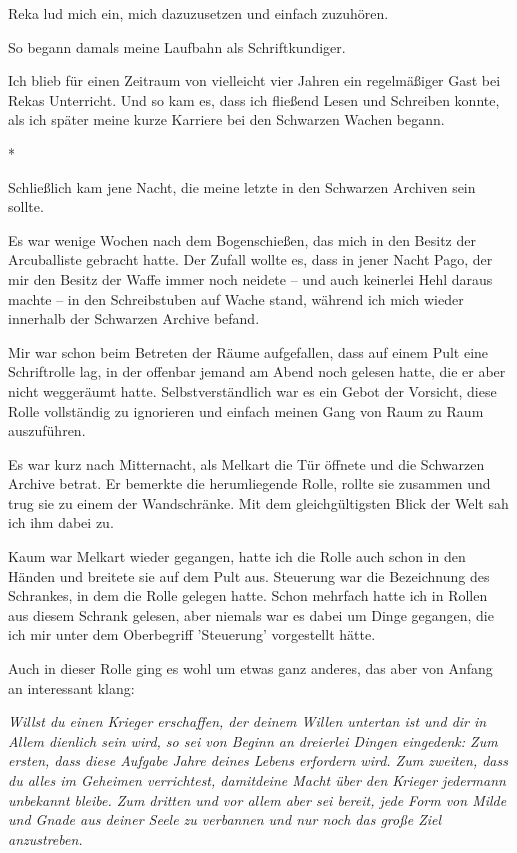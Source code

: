 \documentclass[10pt, a4paper, oneside]{book}
\begin{document}
\begin{multicols}{2}
Reka lud mich ein, mich dazuzusetzen und einfach zuzuhören.

So begann damals meine Laufbahn als Schriftkundiger.

Ich blieb für einen Zeitraum von vielleicht vier Jahren ein regelmäßiger Gast bei Rekas Unterricht. Und so kam es, dass ich fließend Lesen und Schreiben konnte, als ich später meine kurze Karriere bei den Schwarzen Wachen begann.

\begin{center}
    *
\end{center}

Schließlich kam jene Nacht, die meine letzte in den Schwarzen Archiven sein
sollte.

Es war wenige Wochen nach dem Bogenschießen, das mich in den Besitz der Arcuballiste gebracht hatte. Der Zufall wollte es, dass in jener Nacht Pago, der mir den Besitz der Waffe immer noch neidete – und auch keinerlei Hehl daraus machte – in den Schreibstuben auf Wache stand, während ich mich wieder innerhalb der Schwarzen Archive befand.

Mir war schon beim Betreten der Räume aufgefallen, dass auf einem Pult eine Schriftrolle lag, in der offenbar jemand am Abend noch gelesen hatte, die er aber nicht weggeräumt hatte. Selbstverständlich war es ein Gebot der Vorsicht, diese Rolle vollständig zu ignorieren und einfach meinen Gang von Raum zu Raum auszuführen.

Es war kurz nach Mitternacht, als Melkart die Tür öffnete und die Schwarzen Archive betrat. Er bemerkte die herumliegende Rolle, rollte sie zusammen und trug sie zu einem der Wandschränke. Mit dem gleichgültigsten Blick der Welt sah ich ihm dabei zu.

Kaum war Melkart wieder gegangen, hatte ich die Rolle auch schon in den Händen und breitete sie auf dem Pult aus. Steuerung war die Bezeichnung des Schrankes, in dem die Rolle gelegen hatte. Schon mehrfach hatte ich in Rollen aus diesem Schrank gelesen, aber niemals war es dabei um Dinge gegangen, die ich mir unter dem Oberbegriff 'Steuerung' vorgestellt hätte.

Auch in dieser Rolle ging es wohl um etwas ganz anderes, das aber von Anfang an interessant klang:

\textit{Willst du einen Krieger erschaffen, der deinem Willen untertan ist und dir in Allem dienlich sein wird, so sei von Beginn an dreierlei Dingen eingedenk: Zum ersten, dass diese Aufgabe Jahre deines Lebens erfordern wird. Zum zweiten, dass du alles im Geheimen verrichtest, damitdeine Macht über den Krieger jedermann unbekannt bleibe. Zum dritten und vor allem aber sei bereit, jede Form von Milde und Gnade aus deiner Seele zu verbannen und nur noch das große Ziel anzustreben.}


\end{multicols}
\end{document}
